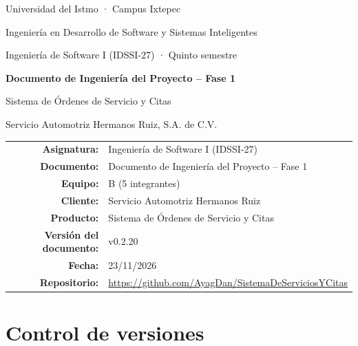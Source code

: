 \newcommand{\versiondoc}{0.2.20}
\newcommand{\fechadoc}{23/11/2026}




\begin{titlepage}
\centering
{\large Universidad del Istmo · Campus Ixtepec\par}
Ingeniería en Desarrollo de Software y Sistemas Inteligentes\par
Ingeniería de Software I (IDSSI-27) · Quinto semestre\par
\vspace{3cm}
{\LARGE\bfseries Documento de Ingeniería del Proyecto -- Fase 1\par}
\vspace{1cm}
{\Large Sistema de Órdenes de Servicio y Citas\par}
\vspace{0.5cm}
Servicio Automotriz Hermanos Ruiz, S.A. de C.V.\par
\vfill
\begin{tabular}{rl}
\textbf{Asignatura:} & Ingeniería de Software I (IDSSI-27)\\
\textbf{Documento:} & Documento de Ingeniería del Proyecto -- Fase 1\\
\textbf{Equipo:} & B (5 integrantes)\\
\textbf{Cliente:} & Servicio Automotriz Hermanos Ruiz\\
\textbf{Producto:} & Sistema de Órdenes de Servicio y Citas\\
\textbf{Versión del documento:} & v\versiondoc\\
\textbf{Fecha:} & \fechadoc\\
\textbf{Repositorio:} & \url{https://github.com/AyagDan/SistemaDeServiciosYCitas}\\
\end{tabular}
\end{titlepage}

\section*{Control de versiones}

